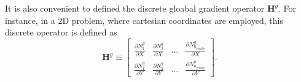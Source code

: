 It is also convenient to defined the discrete gloabal gradient operator \(\mathbf H^g\).
For instance, in a 2D problem, where cartesian coordinates are employed, this discrete operator is defined as
\begin{equation} \label{eq:discrete_grad_op}
  \mathbf H^g\equiv \left[
  \begin{array}{cccc}
    \displaystyle{\frac{\partial N^g_1}{\partial X}} & \displaystyle{\frac{\partial N^g_2}{\partial X}} & \dots & \displaystyle{\frac{\partial N^g_{n_\text{points}}}{\partial X}} \\[10pt]
    \displaystyle{\frac{\partial N^g_1}{\partial Y}} & \displaystyle{\frac{\partial N^g_2}{\partial Y}} & \dots & \displaystyle{\frac{\partial N^g_{n_\text{points}}}{\partial Y}}
  \end{array}
  \right].
\end{equation}

